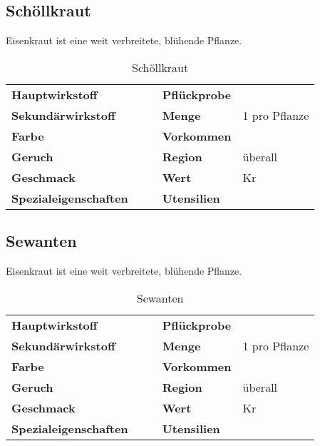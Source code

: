 \subsection{Schöllkraut}
Eisenkraut ist eine weit verbreitete, blühende Pflanze. 

\begin{table}[h]
\begin{center}
\begin{tabular}{|l|l|p{1cm}|l|l|}
	\cline{1-2} \cline{4-5}
	\textbf{Hauptwirkstoff} &  && \textbf{Pflückprobe} &  \\ \cline{1-2} \cline{4-5}
	\textbf{Sekundärwirkstoff} &  && \textbf{Menge} & 1 pro Pflanze \\ \cline{1-2} \cline{4-5}
	\textbf{Farbe} &  && \textbf{Vorkommen} &  \\ \cline{1-2} \cline{4-5}
	\textbf{Geruch} &  && \textbf{Region} & überall \\ \cline{1-2} \cline{4-5}
	\textbf{Geschmack} &  && \textbf{Wert} & Kr \\ \cline{1-2} \cline{4-5}
	\textbf{Spezialeigenschaften} &  && \textbf{Utensilien} &  \\ \cline{1-2} \cline{4-5}
\end{tabular}
\end{center}
\caption{Schöllkraut}
\label{tab:schoellkraut}
\end{table}


\subsection{Sewanten}
Eisenkraut ist eine weit verbreitete, blühende Pflanze. 

\begin{table}[h]
\begin{center}
\begin{tabular}{|l|l|p{1cm}|l|l|}
	\cline{1-2} \cline{4-5}
	\textbf{Hauptwirkstoff} &  && \textbf{Pflückprobe} &  \\ \cline{1-2} \cline{4-5}
	\textbf{Sekundärwirkstoff} &  && \textbf{Menge} & 1 pro Pflanze \\ \cline{1-2} \cline{4-5}
	\textbf{Farbe} &  && \textbf{Vorkommen} &  \\ \cline{1-2} \cline{4-5}
	\textbf{Geruch} &  && \textbf{Region} & überall \\ \cline{1-2} \cline{4-5}
	\textbf{Geschmack} &  && \textbf{Wert} & Kr \\ \cline{1-2} \cline{4-5}
	\textbf{Spezialeigenschaften} &  && \textbf{Utensilien} &  \\ \cline{1-2} \cline{4-5}
\end{tabular}
\end{center}
\caption{Sewanten}
\label{tab:sewanten}
\end{table}


